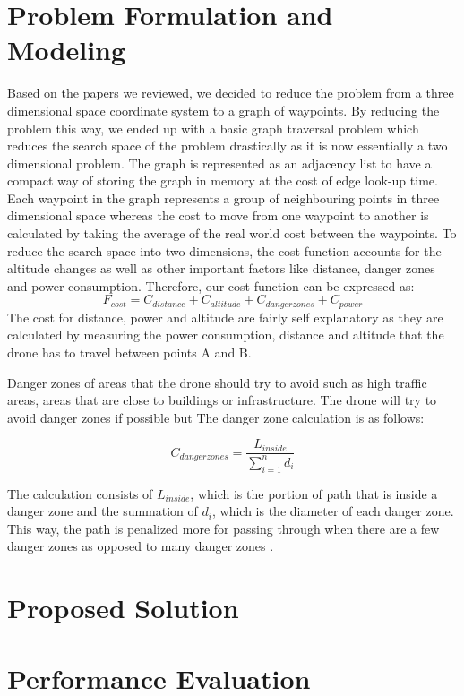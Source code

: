 \documentclass[conference]{IEEEtran}
\begin{document}
\section{Problem Formulation and Modeling}
Based on the papers we reviewed, we decided to reduce the problem from a three dimensional space coordinate system to a graph of waypoints. By reducing the problem this way, we ended up with a basic graph traversal problem which reduces the search space of the problem drastically as it is now essentially a two dimensional problem. The graph is represented as an adjacency list to have a compact way of storing the graph in memory at the cost of edge look-up time. Each waypoint in the graph represents a group of neighbouring points in three dimensional space whereas the cost to move from one waypoint to another is calculated by taking the average of the real world cost between the waypoints. To reduce the search space into two dimensions, the cost function accounts for the altitude changes as well as other important factors like distance, danger zones and power consumption. Therefore, our cost function can be expressed as:
$$F_{cost} = C_{distance} + C_{altitude} + C_{danger zones} + C_{power}$$
The cost for distance, power and altitude are fairly self explanatory as they are calculated by measuring the power consumption, distance and altitude that the drone has to travel between points A and B.

Danger zones of areas that the drone should try to avoid such as high traffic areas, areas that are close to buildings or infrastructure. The drone will try to avoid danger zones if possible but  The danger zone calculation is as follows: 

$$ C_{danger zones} = \frac{L_{inside}}{\sum_{i=1}^{n} d_{i}} $$

The calculation consists of $L_{inside}$, which is the portion of path that is inside a danger zone and the summation of $d_{i}$, which is the diameter of each danger zone. This way, the path is penalized more for passing through when there are a few danger zones as opposed to many danger zones \cite{b1}. 

\section{Proposed Solution}
\blindtext

\section{Performance Evaluation}
\blindtext
\end{document}
